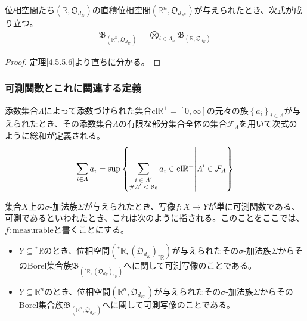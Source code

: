 \documentclass[dvipdfmx]{jsarticle}
\begin{document}
\begin{thm}\label{4.5.5.7}
位相空間たち$\left( \mathbb{R},\mathfrak{O}_{d_{E}} \right)$の直積位相空間$\left( \mathbb{R}^{n},\mathfrak{O}_{d_{E^{n}}} \right)$が与えられたとき、次式が成り立つ。
\begin{align*}
\mathfrak{B}_{\left( \mathbb{R}^{n},\mathfrak{O}_{d_{E^{n}}} \right)} = \bigotimes_{i \in \varLambda_{n} } \mathfrak{B}_{\left( \mathbb{R},\mathfrak{O}_{d_{E}} \right)}
\end{align*}
\end{thm}
\begin{proof} 定理\ref{4.5.5.6}より直ちに分かる。
\end{proof}
\subsubsection{可測関数とこれに関連する定義}%
\begin{dfn}
添数集合$\varLambda$によって添数づけられた集合$\mathrm{cl}\mathbb{R}^{+} = [ 0,\infty]$の元々の族$\left\{ a_{i} \right\}_{i \in \varLambda}$が与えられたとき、その添数集合$\varLambda$の有限な部分集合全体の集合$\mathcal{F}_{\varLambda}$を用いて次式のように総和が定義される。
\begin{align*}
\sum_{i \in \varLambda} a_{i} = \sup\left\{ \sum_{\scriptsize \begin{matrix}
i \in \varLambda' \\
\#\varLambda' < \aleph_{0} \\
\end{matrix}} a_{i} \in \mathrm{cl}\mathbb{R}^{+} \middle| \varLambda' \in \mathcal{F}_{\varLambda} \right\}
\end{align*}
\end{dfn}
\begin{dfn}
集合$X$上の$\sigma$-加法族$\varSigma$が与えられたとき、写像$f:X \rightarrow Y$が単に可測関数である、可測であるといわれたとき、これは次のように指される。このことをここでは、$f:\mathrm{measurable}$と書くことにする。
\begin{itemize}
\item
  $Y \subseteq{}^{*}\mathbb{R}$のとき、位相空間$\left({}^{*}\mathbb{R},\left( \mathfrak{O}_{d_{E}} \right)_{{}^{*}\mathbb{R}} \right)$が与えられたその$\sigma$-加法族$\varSigma$からそのBorel集合族$\mathfrak{B}_{\left({}^{*}\mathbb{R},\left( \mathfrak{O}_{d_{E}} \right)_{{}^{*}\mathbb{R}} \right)}$へに関して可測写像のことである。
\item
  $Y \subseteq \mathbb{R}^{n}$のとき、位相空間$\left( \mathbb{R}^{n},\mathfrak{O}_{d_{E^{n}}} \right)$が与えられたその$\sigma$-加法族$\varSigma$からそのBorel集合族$\mathfrak{B}_{\left( \mathbb{R}^{n},\mathfrak{O}_{d_{E^{n}}} \right)}$へに関して可測写像のことである。
\end{itemize}
\end{dfn}\par
\end{document}
